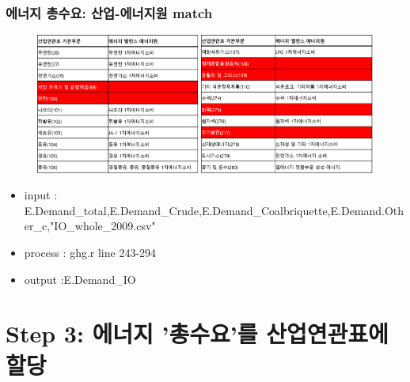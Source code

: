 \documentclass[10pt,compress,slidetop,%
			   hyperref={unicode},xcolor={svgnames},%
			   t]{beamer}
\begin{document}
\begin{frame}
	\frametitle{에너지 총수요: 산업-에너지원 match}
	  	\begin{figure}
	\centering
	 \includegraphics[width=1.00\textwidth]{match.png}
	\end{figure}	
\begin{scriptsize}
\begin{itemize}
\item{input : E.Demand\_total,E.Demand\_Crude,E.Demand\_Coalbriquette,E.Demand.Other\_c,"IO\_whole\_2009.csv"}
\item{process : ghg.r line 243-294}
\item{output :E.Demand\_IO }
\end{itemize}
\end{scriptsize} 	
\end{frame}

\section{Step 3: 에너지 '총수요'를 산업연관표에 할당 }
\end{document}
